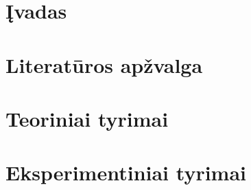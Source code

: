 \documentclass[12pt]{article}
\begin{document}
\section*{Įvadas}


    \blindtext                         %
    \par                               %
    \blindtext                         %

\newpage


\section{Literatūros apžvalga}


\newpage


\section{Teoriniai tyrimai}

    \blindtext[10]                     %

\newpage


\section{Eksperimentiniai tyrimai}


\newpage
\end{document}
